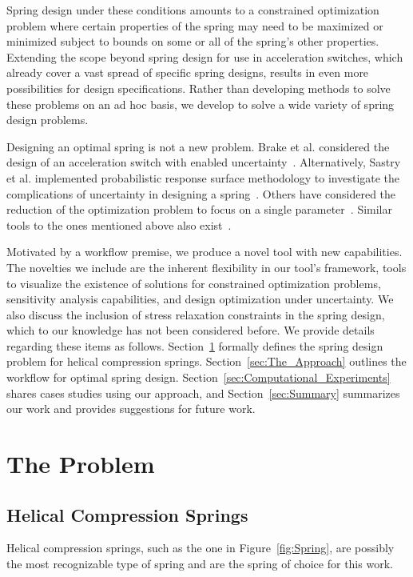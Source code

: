\documentclass[10pt]{article}
\begin{document}
Spring design under these conditions amounts to a constrained optimization problem where certain properties of the spring may need to be maximized or minimized subject to bounds on some or all of the spring's other properties. Extending the scope beyond spring design for use in acceleration switches, which already cover a vast spread of specific spring designs, results in even more possibilities for design specifications. Rather than developing methods to solve these problems on an ad hoc basis, we develop to solve a wide variety of spring design problems. 

Designing an optimal spring is not a new problem. Brake et al. considered the design of an acceleration switch with enabled uncertainty~\cite{IMSM2010}. Alternatively, Sastry et al. implemented probabilistic response surface methodology to investigate the complications of uncertainty in designing a spring~\cite{Reliability}. Others have considered the reduction of the optimization problem to focus on a single parameter~\cite{Robust}. Similar tools to the ones mentioned above also exist~\cite{Paredes}.

Motivated by a workflow premise, we produce a novel tool with new capabilities. The novelties we include are the inherent flexibility in our tool's framework, tools to visualize the existence of solutions for constrained optimization problems, sensitivity analysis capabilities, and design optimization under uncertainty. We also discuss the inclusion of stress relaxation constraints in the spring design, which to our knowledge has not been considered before. We provide details regarding these items as follows. Section~\ref{sec:The_Problem} formally defines the spring design problem for helical compression springs. Section~\ref{sec:The_Approach} outlines the workflow for optimal spring design. Section~\ref{sec:Computational_Experiments} shares cases studies using our approach, and Section~\ref{sec:Summary} summarizes our work and provides suggestions for future work.

			
\section{The Problem} 
\label{sec:The_Problem}

\subsection{Helical Compression Springs}
\label{sec:Springs}

Helical compression springs, such as the one in Figure~\ref{fig:Spring}, are possibly the most recognizable type of spring and are the spring of choice for this work. 
\end{document}
